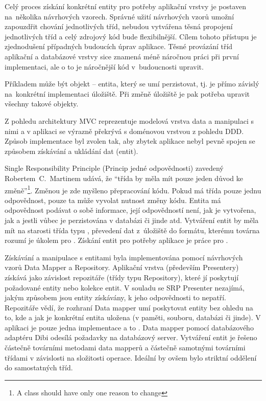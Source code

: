 Celý proces získání konkrétní entity pro potřeby aplikační vrstvy je postaven na~několika návrhových vzorech. Správné užití návrhových vzorů umožní zapouzdřit chování jednotlivých tříd, nebudou vytvářena těsná propojení jednotlivých tříd a celý zdrojový kód bude flexibilnější. Cílem tohoto přístupu je zjednodušení případných budoucích úprav aplikace. Těsné provázání tříd aplikační a databázové vrstvy sice znamená méně náročnou práci při první implementaci, ale o to je náročnější kód v~budoucnosti upravit. 

Příkladem může být objekt -- entita, který se umí perzistovat, tj. je přímo závislý na~konkrétní implementaci úložiště. Při změně úložiště je pak potřeba upravit všechny takové objekty.

Z pohledu architektury MVC reprezentuje modelová vrstva data a manipulaci s nimi a v aplikaci se výrazně překrývá s doménovou vrstvou z pohledu DDD. Způsob implementace byl zvolen tak, aby zbytek aplikace nebyl pevně spojen se způsobem získávání a ukládání dat (entit).

Single Responsibility Principle (Princip jedné odpovědnosti) zavedený Robertem~C.~Martinem udává, že ``třída by měla mít pouze jeden důvod ke změně''\footnote{A class should have only one reason to change\cite{Martin2002}}. Změnou je zde myšleno přepracování kódu. Pokud má třída pouze jednu odpovědnost, pouze ta může vyvolat nutnost změny kódu. Entita má odpovědnost podávat o sobě informace, její odpovědností není, jak je vytvořena, jak a jestli vůbec je perzistována v databázi či jinde atd. Vytváření entit by měla mít na starosti třída typu , převedení dat z~úložiště do formátu, kterému továrna rozumí je úkolem pro . Získání entit pro potřeby aplikace je práce pro . 

Získávání a manipulace s entitami byla implementována pomocí návrhových vzorů Data Mapper a Repository. Aplikační vrstva (především Presentery) získává jako závislost repozitáře (třídy typu Repository), které jí poskytují požadované entity nebo kolekce entit. V souladu se SRP Presenter nezajímá, jakým způsobem jsou entity získávány, k jeho odpovědnosti to nepatří. Repozitáře vědí, že rozhraní Data mapper umí poskytovat entity bez ohledu na to, kde a jak je konkrétní entita uložena (v paměti, souboru, databázi či jinde). V aplikaci je pouze jedna implementace a to . Data mapper pomocí databázového adaptéru Dibi odesílá požadavky na databázový server. Vytváření entit je řešeno částečně továrními metodami data mapperů a částečně samotnými továrními třídami v závislosti na složitosti operace. Ideální by ovšem bylo striktní oddělení do samostatných tříd.

